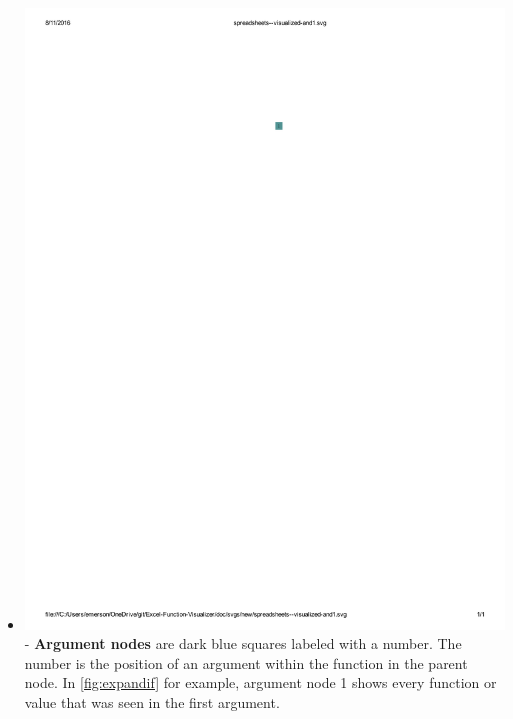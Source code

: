 \documentclass[conference]{IEEEtran}
\begin{document}
\begin{itemize}
		\item  \vspace{.25cm} \includegraphics{glossary-blue} - \textbf{Argument
			nodes} are dark blue squares labeled with a number. The number is the position
		of an argument within the function in the parent node. In \ref{fig:expandif}
		for example, argument node 1 shows every function or value that was seen in
		the first argument.
		

\end{itemize}
\end{document}
